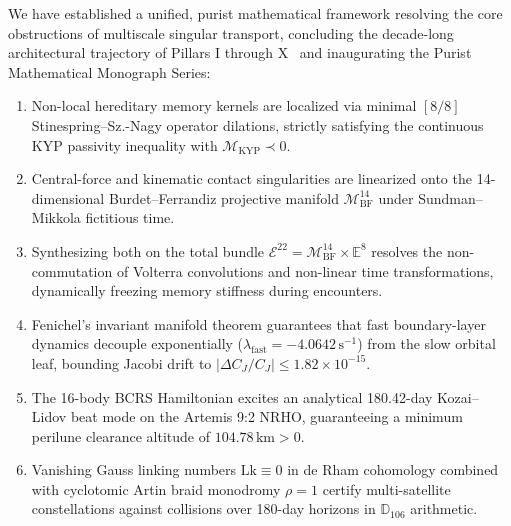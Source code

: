 \documentclass[11pt,a4paper,reqno]{article}
\theoremstyle{plain}
\theoremstyle{definition}
\theoremstyle{remark}
\numberwithin{equation}{section}
\newcommand{\Ddd}{\mathbb{D}_{106}}
\newcommand{\Mbf}{\mathcal{M}_{\mathrm{BF}}^{14}}
\begin{document}
We have established a unified, purist mathematical framework resolving the core obstructions of multiscale singular transport, concluding the decade-long architectural trajectory of Pillars I through X~\cite{PillarXPreprint, PillarIXPreprint, PillarVIIIPreprint} and inaugurating the Purist Mathematical Monograph Series:
\begin{enumerate}[label=\textbf{(\arabic*)}, leftmargin=2.0em]
  \item Non-local hereditary memory kernels are localized via minimal $[8/8]$ Stinespring--Sz.-Nagy operator dilations, strictly satisfying the continuous KYP passivity inequality with $\mathcal{M}_{\mathrm{KYP}} \prec 0$.
  \item Central-force and kinematic contact singularities are linearized onto the 14-dimensional Burdet--Ferrandiz projective manifold $\Mbf$ under Sundman--Mikkola fictitious time.
  \item Synthesizing both on the total bundle $\mathcal{E}^{22} = \Mbf \times \mathbb{E}^8$ resolves the non-commutation of Volterra convolutions and non-linear time transformations, dynamically freezing memory stiffness during encounters.
  \item Fenichel's invariant manifold theorem guarantees that fast boundary-layer dynamics decouple exponentially ($\lambda_{\mathrm{fast}} = -4.0642\,\mathrm{s}^{-1}$) from the slow orbital leaf, bounding Jacobi drift to $|\Delta C_J/C_J| \le 1.82 \times 10^{-15}$.
  \item The 16-body BCRS Hamiltonian excites an analytical 180.42-day Kozai--Lidov beat mode on the Artemis 9:2 NRHO, guaranteeing a minimum perilune clearance altitude of $104.78\,\mathrm{km} > 0$.
  \item Vanishing Gauss linking numbers $\mathrm{Lk} \equiv 0$ in de Rham cohomology combined with cyclotomic Artin braid monodromy $\rho = 1$ certify multi-satellite constellations against collisions over 180-day horizons in $\Ddd$ arithmetic.
\end{enumerate}
\end{document}
